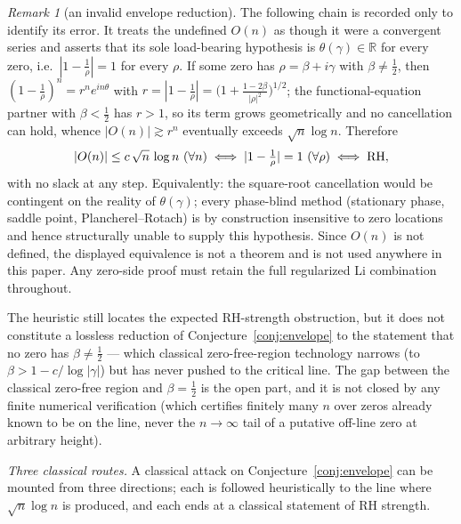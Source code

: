 \documentclass[11pt]{amsart}
\theoremstyle{definition}
\theoremstyle{remark}
\newtheorem{remark}[theorem]{Remark}
\theoremstyle{definition}
\newcommand{\R}{\mathbb{R}}
\begin{document}
\begin{remark}[an invalid envelope reduction]\label{prop:envelope-reduction}
The following chain is recorded only to identify its error.  It treats the undefined $O(n)$ as though it were a convergent series and asserts that its sole
load-bearing hypothesis is $\theta(\gamma)
\in\R$ for every zero, i.e.\ $|1-\tfrac1\rho|=1$ for every $\rho$.  If some zero has $\rho=\beta+i\gamma$
with $\beta\neq\tfrac12$, then $(1-\tfrac1\rho)^n=r^n e^{in\theta}$ with
$r=|1-\tfrac1\rho|=\big(1+\tfrac{1-2\beta}{|\rho|^2}\big)^{1/2}$; the functional-equation partner with
$\beta<\tfrac12$ has $r>1$, so its term grows geometrically and no cancellation can hold, whence
$|O(n)|\gtrsim r^n$ eventually exceeds $\sqrt n\log n$.  Therefore
\[
   |O(n)|\le c\,\sqrt n\,\log n\ (\forall n)
   \iff |1-\tfrac1\rho|=1\ (\forall\rho)
   \iff \textnormal{RH},
\]
with no slack at any step.  Equivalently: the square-root cancellation would be contingent on
the reality of $\theta(\gamma)$; every phase-blind method (stationary phase, saddle point,
Plancherel--Rotach) is by construction insensitive to zero locations and hence structurally unable to
supply this hypothesis.  Since $O(n)$ is not defined, the displayed equivalence is not a theorem and
is not used anywhere in this paper.  Any zero-side proof must retain the full regularized Li
combination throughout.
\end{remark}
\noindent The heuristic still locates the expected RH-strength obstruction, but it does not constitute
a lossless reduction of Conjecture~\ref{conj:envelope} to the statement that no zero has $\beta\neq\tfrac12$
--- which classical zero-free-region technology narrows (to $\beta>1-c/\log|\gamma|$) but has never
pushed to the critical line.  The gap between the classical zero-free region and $\beta=\tfrac12$ is
the open part, and it is not closed by any finite numerical verification (which certifies finitely
many $n$ over zeros already known to be on the line, never the $n\to\infty$ tail of a putative off-line
zero at arbitrary height).

\emph{Three classical routes.}  A classical attack on
Conjecture~\ref{conj:envelope} can be mounted from three directions; each is followed heuristically
to the line where $\sqrt n\log n$ is produced, and each ends at a classical statement of RH strength.
\end{document}
